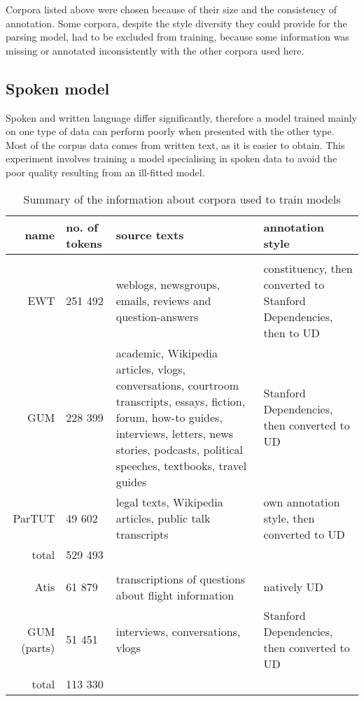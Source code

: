 Corpora listed above were chosen because of their size and the consistency of annotation. Some corpora, despite the style diversity they could provide for the parsing model, had to be excluded from training, because some information was missing or annotated inconsistently with the other corpora used here. 


\subsection{Spoken model}
Spoken and written language differ significantly, therefore a model trained mainly on one type of data can perform poorly when presented with the other type. Most of the corpus data comes from written text, as it is easier to obtain. This experiment involves training a model specialising in spoken data to avoid the poor quality resulting from an ill-fitted model. 

\begin{table}[h!]
\begin{adjustwidth}{-20pt}{20pt}
	\begin{tabular}{r || p{2.5cm} | p{5cm} | p{3.5cm}}
		name & no. of tokens & source texts & annotation style\\
		\hline\hline
		\rowcolor{lightgray} \multicolumn{4}{c}{combined model}\\
		\hline\hline
		EWT & 251 492 & weblogs, newsgroups, emails, reviews and question-answers & constituency, then converted to Stanford Dependencies, then to UD\\\hline
		GUM & 228 399 & academic, Wikipedia articles, vlogs, conversations, courtroom transcripts, essays, fiction, forum, how-to guides, interviews, letters, news stories, podcasts, political speeches, textbooks, travel guides & Stanford Dependencies, then converted to UD\\\hline
		ParTUT & 49 602 & legal texts, Wikipedia articles, public talk transcripts & own annotation style, then converted to UD\\\hline
		total & \multicolumn{3}{l}{529 493}\\
		\hline\hline
		\rowcolor{lightgray} \multicolumn{4}{c}{spoken model}\\
		\hline\hline
		Atis & 61 879 & transcriptions of questions about flight information & natively UD\\\hline
		GUM (parts) & 51 451 & interviews, conversations, vlogs & Stanford Dependencies, then converted to UD\\\hline
		total & \multicolumn{3}{l}{113 330}
	\end{tabular}
\end{adjustwidth}
\caption{Summary of the information about corpora used to train models}\label{tab:corpora}
\end{table}

